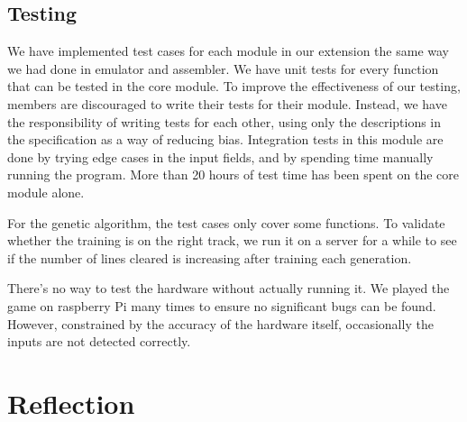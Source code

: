 \documentclass[11pt]{article}
\begin{document}
    

\subsection{Testing}
\begin{flushleft}
We have implemented test cases for each module in our extension the same way we had done in emulator and assembler. We have unit tests for every function that can be tested in the core module. To improve the effectiveness of our testing, members are discouraged to write their tests for their module. Instead, we have the responsibility of writing tests for each other, using only the descriptions in the specification as a way of reducing bias. Integration tests in this module are done by trying edge cases in the input fields, and by spending time manually running the program. More than 20 hours of test time has been spent on the core module alone. 
\end{flushleft}

\begin{flushleft}
For the genetic algorithm, the test cases only cover some functions. To validate whether the training is on the right track, we run it on a server for a while to see if the number of lines cleared is increasing after training each generation.
\end{flushleft}

\begin{flushleft}
There's no way to test the hardware without actually running it. We played the game on raspberry Pi many times to ensure no significant bugs can be found. However, constrained by the accuracy of the hardware itself, occasionally the inputs are not detected correctly.
\end{flushleft}


\section{Reflection}

\end{document}
